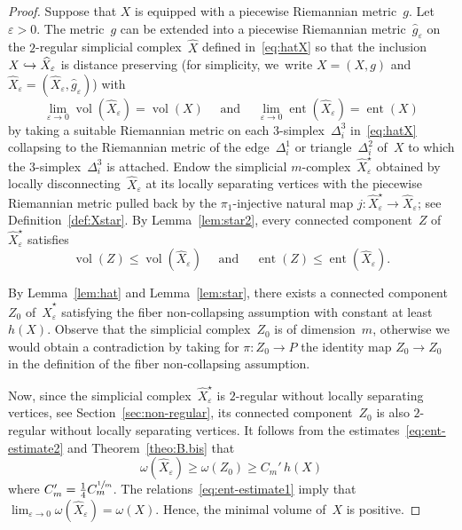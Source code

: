\documentclass[11pt]{article}
\newcommand\hto{\mathrel{\lhook\joinrel\to}}
\let\oldsfrac\sfrac
\renewcommand{\sfrac}[2]{{\oldsfrac{#1}{#2}}}
\theoremstyle{definition}
\DeclareMathOperator{\ent}{ent}\let\eent\ent
\DeclareMathOperator{\vol}{vol}
\numberwithin{equation}{section}
\begin{document}
\begin{proof}
Suppose that $X$ is equipped with a piecewise Riemannian metric~$g$.
Let $\varepsilon>0$.
The metric~$g$ can be extended into a piecewise Riemannian metric~$\hat{g}_\varepsilon$ on the $2$-regular simplicial complex~$\widehat{X}$ defined in~\eqref{eq:hatX} so that the inclusion~$X \hto \widehat{X}_\varepsilon$ is distance preserving (for simplicity, we~write $X=(X,g)$ and $\widehat{X}_\varepsilon=(\widehat{X}_\varepsilon,\hat{g}_\varepsilon)$) with
\begin{equation} \label{eq:ent-estimate1}
\lim_{\varepsilon \to 0} \vol(\widehat{X}_\varepsilon) = \vol(X) \quad \text{ and } \quad \lim_{\varepsilon \to 0} \ent(\widehat{X}_\varepsilon) = \ent(X)
\end{equation}
by taking a suitable Riemannian metric on each $3$-simplex~$\Delta_i^3$ in~\eqref{eq:hatX} collapsing to the Riemannian metric of the edge~$\Delta_i^1$ or triangle~$\Delta_i^2$ of~$X$ to which the $3$-simplex~$\Delta_i^3$ is attached.
Endow the simplicial $m$\nobreakdash-complex~$\widehat{X}^\star_\varepsilon$ obtained by locally disconnecting~$\widehat{X}_\varepsilon$ at its locally separating vertices with the piecewise Riemannian metric pulled back by the $\pi_1$-injective natural map $j:\widehat{X}^\star_\varepsilon \to \widehat{X}_\varepsilon$; see Definition~\ref{def:Xstar}.
By Lemma~\ref{lem:star2}, every connected component~$Z$ of~$\widehat{X}^\star_\varepsilon$ satisfies
\begin{equation} \label{eq:ent-estimate2}
\vol(Z) \leq \vol(\widehat{X}_\varepsilon) \quad \text{ and } \quad \ent(Z) \leq \ent(\widehat{X}_\varepsilon).
\end{equation}

By Lemma~\ref{lem:hat} and Lemma~\ref{lem:star}, there exists a connected component~$Z_0$ of~$\widehat{X}^\star_\varepsilon$ satisfying the fiber non-collapsing assumption with constant at least~$h(X)$.
Observe that the simplicial complex~$Z_0$ is of dimension~$m$, otherwise we would obtain a contradiction by taking for \mbox{$\pi:Z_0 \to P$} the identity map $Z_0 \to Z_0$ in the definition of the fiber non-collapsing assumption.

Now, since the simplicial complex~$\widehat{X}^\star_\varepsilon$ is $2$-regular without locally separating vertices, see Section~\ref{sec:non-regular}, its connected component~$Z_0$ is also $2$-regular without locally separating vertices.
It follows from the estimates~\eqref{eq:ent-estimate2} and Theorem~\ref{theo:B.bis} that
\[
\omega(\widehat{X}_\varepsilon) \geq \omega(Z_0) \geq C_m' \, h(X)
\]
where $C_m'=\frac{1}{4} C_m^{\sfrac{1}{m}}$.
The relations~\eqref{eq:ent-estimate1} imply that $\lim_{\varepsilon \to 0} \omega(\widehat{X}_\varepsilon) = \omega(X)$.
Hence, the minimal volume of~$X$ is positive.
\end{proof}
\end{document}
